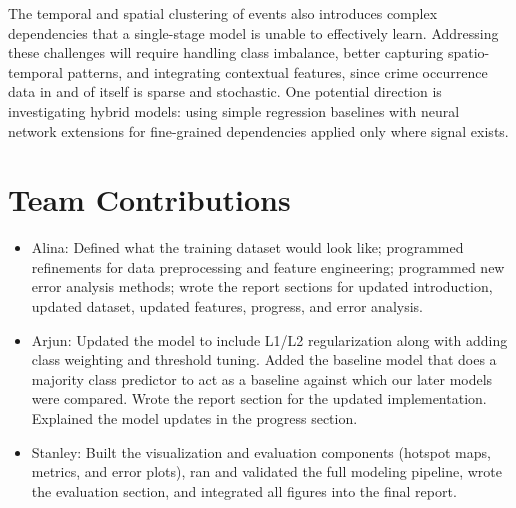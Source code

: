 \documentclass[11pt]{article}
\begin{document}
The temporal and spatial clustering of events also introduces complex dependencies that a single-stage model is unable to effectively learn. Addressing these challenges will require handling class imbalance, better capturing spatio-temporal patterns, and integrating contextual features, since crime occurrence data in and of itself is sparse and stochastic. One potential direction is investigating hybrid models: using simple regression baselines with neural network extensions for fine-grained dependencies applied only where signal exists.


\section*{Team Contributions}

\begin{itemize}
    \item Alina: Defined what the training dataset would look like; programmed refinements for data preprocessing and feature engineering; programmed new error analysis methods; wrote the report sections for updated introduction, updated dataset, updated features, progress, and error analysis.
    \item Arjun: Updated the model to include L1/L2 regularization along with adding class weighting and threshold tuning. Added the baseline model that does a majority class predictor to act as a baseline against which our later models were compared. Wrote the report section for the updated implementation. Explained the model updates in the progress section. 
    \item Stanley: Built the visualization and evaluation components (hotspot maps, metrics, and error plots), ran and validated the full modeling pipeline, wrote the evaluation section, and integrated all figures into the final report.
\end{itemize}


\vspace{1em}
\renewcommand{\refname}{}
\vspace{-3em}
\end{document}
